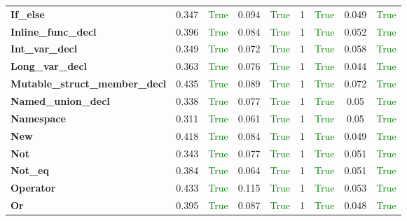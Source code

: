 \documentclass{article}
\begin{document}
\begin{xltabular}{\textwidth}{lcccccccc}
\textbf{{\fontsize{10}{12}\selectfont If\_else}}& 0.347&\textcolor{green}{True}& 0.094&\textcolor{green}{True}& 1&\textcolor{green}{True}& 0.049&\textcolor{green}{True} \\[0.5ex]
\textbf{{\fontsize{10}{12}\selectfont Inline\_func\_decl}}& 0.396&\textcolor{green}{True}& 0.084&\textcolor{green}{True}& 1&\textcolor{green}{True}& 0.052&\textcolor{green}{True} \\[0.5ex]
\textbf{{\fontsize{10}{12}\selectfont Int\_var\_decl}}& 0.349&\textcolor{green}{True}& 0.072&\textcolor{green}{True}& 1&\textcolor{green}{True}& 0.058&\textcolor{green}{True} \\[0.5ex]
\textbf{{\fontsize{10}{12}\selectfont Long\_var\_decl}}& 0.363&\textcolor{green}{True}& 0.076&\textcolor{green}{True}& 1&\textcolor{green}{True}& 0.044&\textcolor{green}{True} \\[0.5ex]
\textbf{{\fontsize{10}{12}\selectfont Mutable\_struct\_member\_decl}}& 0.435&\textcolor{green}{True}& 0.089&\textcolor{green}{True}& 1&\textcolor{green}{True}& 0.072&\textcolor{green}{True} \\[0.5ex]
\textbf{{\fontsize{10}{12}\selectfont Named\_union\_decl}}& 0.338&\textcolor{green}{True}& 0.077&\textcolor{green}{True}& 1&\textcolor{green}{True}& 0.05&\textcolor{green}{True} \\[0.5ex]
\textbf{{\fontsize{10}{12}\selectfont Namespace}}& 0.311&\textcolor{green}{True}& 0.061&\textcolor{green}{True}& 1&\textcolor{green}{True}& 0.05&\textcolor{green}{True} \\[0.5ex]
\textbf{{\fontsize{10}{12}\selectfont New}}& 0.418&\textcolor{green}{True}& 0.084&\textcolor{green}{True}& 1&\textcolor{green}{True}& 0.049&\textcolor{green}{True} \\[0.5ex]
\textbf{{\fontsize{10}{12}\selectfont Not}}& 0.343&\textcolor{green}{True}& 0.077&\textcolor{green}{True}& 1&\textcolor{green}{True}& 0.051&\textcolor{green}{True} \\[0.5ex]
\textbf{{\fontsize{10}{12}\selectfont Not\_eq}}& 0.384&\textcolor{green}{True}& 0.064&\textcolor{green}{True}& 1&\textcolor{green}{True}& 0.051&\textcolor{green}{True} \\[0.5ex]
\textbf{{\fontsize{10}{12}\selectfont Operator}}& 0.433&\textcolor{green}{True}& 0.115&\textcolor{green}{True}& 1&\textcolor{green}{True}& 0.053&\textcolor{green}{True} \\[0.5ex]
\textbf{{\fontsize{10}{12}\selectfont Or}}& 0.395&\textcolor{green}{True}& 0.087&\textcolor{green}{True}& 1&\textcolor{green}{True}& 0.048&\textcolor{green}{True} \\[0.5ex]

\end{xltabular}
\end{document}
